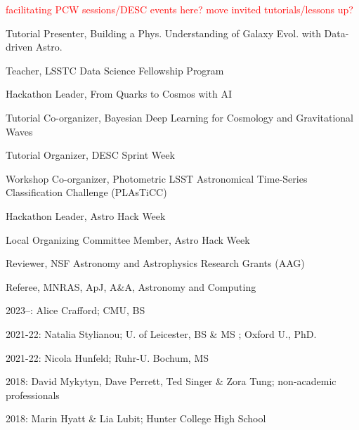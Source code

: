 \documentclass[11pt,letterpaper]{article}
\begin{document}
{\fontsize{9pt}{5pt}\selectfont\textcolor{red}{facilitating PCW sessions/DESC events here? move invited tutorials/lessons up?}}
\nopagebreak\begin{list}{}{\malzlist}
	\item Tutorial Presenter, Building a Phys. Understanding of Galaxy Evol. with Data-driven Astro. 
	\item Teacher, LSSTC Data Science Fellowship Program 
	\item Hackathon Leader, From Quarks to Cosmos with AI 
	\item Tutorial Co-organizer, Bayesian Deep Learning for Cosmology and Gravitational Waves 
	\item Tutorial Organizer, DESC Sprint Week 
	\item Workshop Co-organizer, Photometric LSST Astronomical Time-Series Classification Challenge (PLAsTiCC) 
	\item Hackathon Leader, Astro Hack Week 
	\item Local Organizing Committee Member, Astro Hack Week 
	\item Reviewer, NSF Astronomy and Astrophysics Research Grants (AAG) 
	\item Referee, MNRAS, ApJ, A\&A, Astronomy and Computing 
\end{list}

\begin{list}{}{\malzlist}
	\item 2023--: Alice Crafford; CMU, BS 
	\item 2021-22: Natalia Stylianou; U. of Leicester, BS \& MS ; Oxford U., PhD. 
	\item 2021-22: Nicola Hunfeld; Ruhr-U. Bochum, MS 
	\item 2018: David Mykytyn, Dave Perrett, Ted Singer \& Zora Tung; non-academic professionals
	\item 2018: Marin Hyatt \& Lia Lubit; Hunter College High School 
\end{list}
\end{document}
